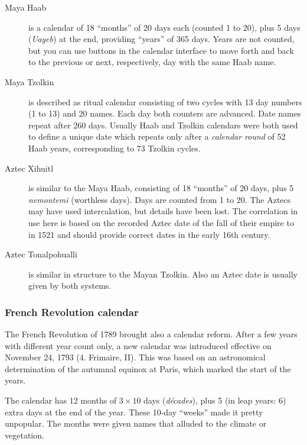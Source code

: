 \begin{description}
\item[Maya Haab] is a calendar of 18 ``months'' of 20 days each
  (counted 1 to 20), plus 5 days (\emph{Uayeb}) at the end, providing
  ``years'' of 365 days. Years are not counted, but you can use
  buttons in the calendar interface to move forth and back to the
  previous or next, respectively, day with the same Haab name.
\item[Maya Tzolkin] is described as ritual calendar consisting of two
  cycles with 13 day numbers (1 to 13) and 20 names. Each day both
  counters are advanced. Date names repeat after 260 days. Usually
  Haab and Tzolkin calendars were both used to define a unique date
  which repeats only after a \emph{calendar round} of 52 Haab years,
  corresponding to 73 Tzolkin cycles.
\item[Aztec Xihuitl] is similar to the Maya Haab, consisting of 18
  ``months'' of 20 days, plus 5 \emph{nemontemi} (worthless
  days). Days are counted from 1 to 20. The Aztecs may have used
  intercalation, but details have been lost. The correlation in use
  here is based on the recorded Aztec date of the fall of their empire
  to  in 1521 and should provide correct dates in the
  early 16th century.
\item[Aztec Tonalpohualli] is similar in structure to the Mayan
  Tzolkin. Also an Aztec date is usually given by both systems.
\end{description}

\subsubsection{French Revolution calendar}
The French Revolution of 1789 brought also a calendar reform. After a
few years with different year count only, a new calendar was
introduced effective on November 24, 1793 (4. Frimaire, II). This was
based on an astronomical determination of the autumnal equinox at
Paris, which marked the start of the years.

The calendar has 12 months of $3\times 10$ days (\emph{d\'ecades}), plus
5 (in leap years: 6) extra days at the end of the year. These 10-day
``weeks'' made it pretty unpopular. The months were given names that
alluded to the climate or vegetation.


